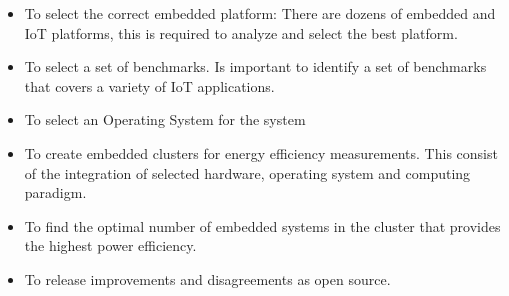 \begin{itemize}

\item To select the correct embedded platform: There are dozens of embedded and
IoT platforms, this is required  to analyze and select the best platform.

\item To select a set of benchmarks. Is important to identify a set of
benchmarks that covers a variety of IoT applications.

\item To select an Operating System for the system 

\item To create embedded clusters for energy efficiency measurements. This
consist of the integration of selected hardware, operating system and computing
paradigm.

\item To find the optimal number of embedded systems in the cluster that
provides the highest power efficiency. 

\item To release improvements and disagreements as open source. 

\end{itemize}

\clearpage
